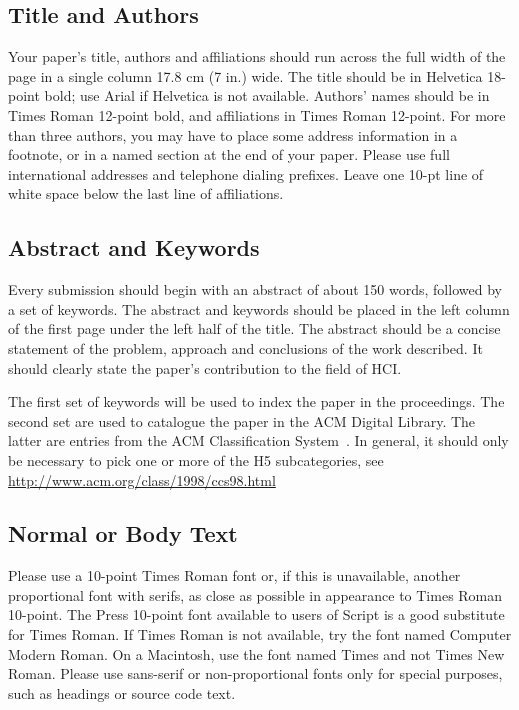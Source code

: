 \documentclass{sigchi-alternate}
\begin{document}
\subsection{Title and Authors}

Your paper's title, authors and affiliations should run across the
full width of the page in a single column 17.8 cm (7 in.) wide.  The
title should be in Helvetica 18-point bold; use Arial if Helvetica is
not available.  Authors' names should be in Times Roman 12-point bold,
and affiliations in Times Roman 12-point.  For more than three authors,
you may have to place some address information in a footnote, or in a named
section at the end of your paper. Please use full international addresses and
telephone dialing prefixes.  Leave one 10-pt line of white space below the last
line of affiliations.

\subsection{Abstract and Keywords}

Every submission should begin with an abstract of about 150 words,
followed by a set of keywords. The abstract and keywords should be
placed in the left column of the first page under the left half of the
title. The abstract should be a concise statement of the problem,
approach and conclusions of the work described.  It should clearly
state the paper's contribution to the field of HCI.

The first set of keywords will be used to index the paper in the
proceedings. The second set are used to catalogue the paper in the ACM
Digital Library. The latter are entries from the ACM Classification
System~\cite{acm_categories}.  In general, it should only be necessary
to pick one or more of the H5 subcategories, see
\url{http://www.acm.org/class/1998/ccs98.html}

\subsection{Normal or Body Text}

Please use a 10-point Times Roman font or, if this is unavailable,
another proportional font with serifs, as close as possible in
appearance to Times Roman 10-point. The Press 10-point font available
to users of Script is a good substitute for Times Roman. If Times
Roman is not available, try the font named Computer Modern Roman. On a
Macintosh, use the font named Times and not Times New Roman. Please
use sans-serif or non-proportional fonts only for special purposes,
such as headings or source code text.
\end{document}
